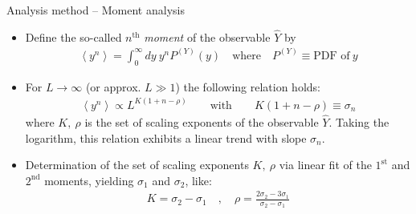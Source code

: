 \documentclass[xcolor=dvipsnames]{beamer}
\newcommand{\myitemsep}{\setlength\itemsep{0.33cm}}
\begin{document}
    \begin{frame}[t]{Analysis method -- Moment analysis}
        \begin{itemize}
            \myitemsep
            \item {Define the so-called $n^{\mathrm{th}}$ \textit{moment} of the observable $\hat{Y}$ by
                \begin{align*}
                \left\langle y^n \right\rangle = \int_{0}^{\infty} dy\ y^n P^{(Y)}(y) \quad \text{where}
                \quad P^{(Y)}\equiv \text{PDF of}\ y
                \end{align*}
            }
            \item {For $L \to \infty$ (or approx. $L\gg 1$) the following relation holds:
                \begin{align*}
                \left\langle y^n \right\rangle \propto L^{K\left(1 + n - \rho \right)} \qquad \text{with}
                                                                \qquad K\left(1 + n - \rho \right) \equiv \sigma_n 
                \end{align*}
                where $K,\ \rho$ is the set of scaling exponents of the observable $\hat{Y}$. Taking the logarithm,
                this relation exhibits a linear trend with slope $\sigma_n$.
            }
            \item {Determination of the set of scaling exponents $K,\ \rho$ via linear fit of the $1^{\text{st}}$ and
                   $2^{\text{nd}}$ moments, yielding $\sigma_1$ and $\sigma_2$, like:
                \begin{align*}
                K = \sigma_2 - \sigma_1 \quad , \quad \rho = \frac{2\sigma_2 - 3\sigma_1}{\sigma_2 - \sigma_1} 
                \end{align*} 
            }
        \end{itemize}
    \end{frame}
    
\end{document}
